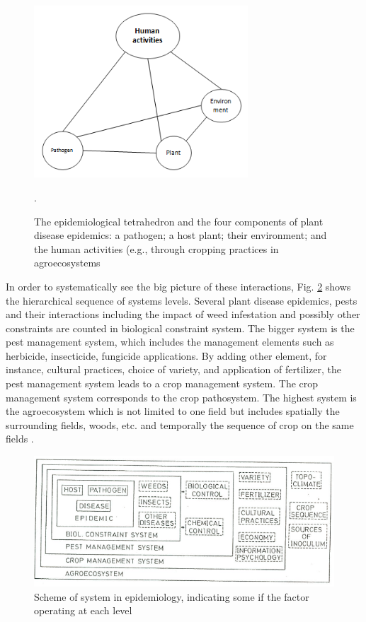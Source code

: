 \begin{figure}
\includegraphics[width=8cm]{distriangle}
\centering
\caption{The epidemiological tetrahedron and the four components of plant disease epidemics: a pathogen; a host plant; their environment; and the human activities (e.g., through cropping practices in agroecosystems}.
\label{fig:diseasetriangle}
\end{figure}

In order to systematically see the big picture of these interactions, Fig. \ref{fig:system_level} shows the hierarchical sequence of systems levels. Several plant disease epidemics, pests and their interactions including the impact of weed infestation and possibly other constraints are counted in biological constraint system. The bigger system is the pest management system, which includes the management elements such as herbicide, insecticide, fungicide applications. By adding other element, for instance, cultural practices, choice of variety, and application of fertilizer, the pest management system leads to a crop management system. The crop management system corresponds to the crop pathosystem. The highest system is the agroecosystem which is not limited to one field but includes spatially the surrounding fields, woods, etc. and temporally the sequence of crop on the same fields \citep{kranz1980systems}.

\begin{figure}
\includegraphics[width=12cm]{system_level}
\centering
\caption{Scheme of system in epidemiology, indicating some if the factor operating at each level \cite{kranz1980systems}}
\label{fig:system_level}
\end{figure}

